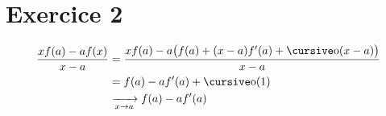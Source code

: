 \part{Exercice 2}

\begin{align*}
	\frac{xf(a) - af(x)}{x-a}
	&= \frac{xf(a) - a\big(f(a) + (x-a)f'(a) + \po(x-a)\big)}{x-a} \\
	&= f(a) - af'(a) + \po(1) \\
	&\tendsto{x\to a} f(a) - af'(a)
\end{align*}
